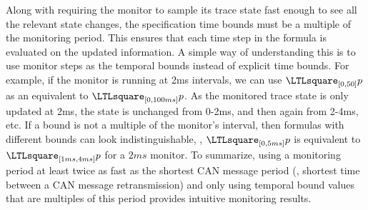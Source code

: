 Along with requiring the monitor to sample its trace state fast enough to see all the relevant state changes, the specification time bounds must be a multiple of the monitoring period.
This ensures that each time step in the formula is evaluated on the updated information.
A simple way of understanding this is to use monitor steps as the temporal bounds instead of explicit time bounds.
For example, if the monitor is running at  2ms intervals, we can use $\henceforth_{[0,50]} p$ as an equivalent to
$\henceforth_{[0,100ms]} p$.
As the monitored trace state is only updated at 2ms, the state is unchanged
from 0-2ms, and then again from 2-4ms, etc.
If a bound is not a multiple of the monitor's interval, then formulas with
different bounds can look indistinguishable,
\eg, $\henceforth_{[0,5ms]} p$ is equivalent to $\henceforth_{[1ms,4ms]} p$
for a $2ms$ monitor.
%
To summarize, using a monitoring period at least twice as fast as the shortest
CAN message period (\ie, shortest time between a CAN message retransmission)
and only using temporal bound values that are multiples of this period provides intuitive monitoring results.


